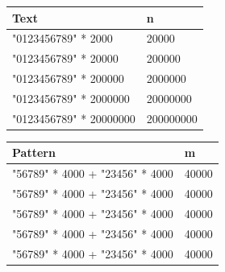 \documentclass[11pt]{article}
\begin{document}
                \begin{table}[!htb]
                        \begin{minipage}{.5\linewidth}
                            \centering
                                \begin{tabular}{ll}
                                    \textbf{Text} & \textbf{n} \\
                                    \hline
                                    "0123456789" * 2000 & 20000 \\
                                    "0123456789" * 20000 & 200000 \\
                                    "0123456789" * 200000 & 2000000 \\
                                    "0123456789" * 2000000 & 20000000 \\
                                    "0123456789" * 20000000 & 200000000 \\
                                \end{tabular}
                        \end{minipage}%
                        \begin{minipage}{.5\linewidth}
                            \centering
                                \begin{tabular}{ll}
                                    \textbf{Pattern} & \textbf{m} \\
                                    \hline
                                    "56789" * 4000 + "23456" * 4000 & 40000 \\
                                    "56789" * 4000 + "23456" * 4000 & 40000 \\
                                    "56789" * 4000 + "23456" * 4000 & 40000 \\
                                    "56789" * 4000 + "23456" * 4000 & 40000 \\
                                    "56789" * 4000 + "23456" * 4000 & 40000 \\
                                \end{tabular}
                        \end{minipage}
                    \label{tab:test_2_3}
                \end{table}
\end{document}
